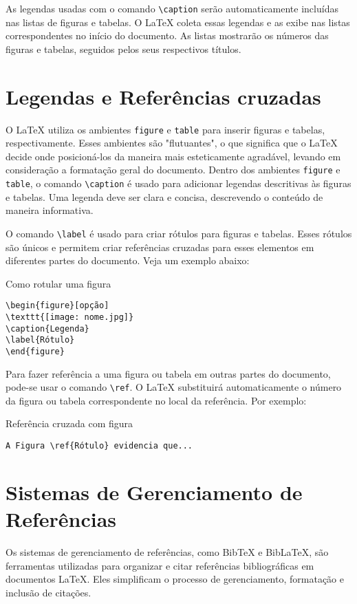\noindent As legendas usadas com o comando \verb|\caption| serão automaticamente incluídas nas listas de figuras e tabelas. O \LaTeX{} coleta essas legendas e as exibe nas listas correspondentes no início do documento. As listas mostrarão os números das figuras e tabelas, seguidos pelos seus respectivos títulos.

\section{Legendas e Referências cruzadas}
\label{sec:4}

O \LaTeX{} utiliza os ambientes \verb|figure| e \verb|table| para inserir figuras e tabelas, respectivamente. Esses ambientes são "flutuantes", o que significa que o \LaTeX{} decide onde posicioná-los da maneira mais esteticamente agradável, levando em consideração a formatação geral do documento. Dentro dos ambientes \verb|figure| e \verb|table|, o comando \verb|\caption| é usado para adicionar legendas descritivas às figuras e tabelas. Uma legenda deve ser clara e concisa, descrevendo o conteúdo de maneira informativa. 

\noindent O comando \verb|\label| é usado para criar rótulos para figuras e tabelas. Esses rótulos são únicos e permitem criar referências cruzadas para esses elementos em diferentes partes do documento. Veja um exemplo abaixo:

\begin{trailer}{Como rotular uma figura}
\begin{verbatim} 
\begin{figure}[opção]
\texttt{[image: nome.jpg]}
\caption{Legenda}
\label{Rótulo}
\end{figure}
\end{verbatim}
\end{trailer}

\noindent Para fazer referência a uma figura ou tabela em outras partes do documento, pode-se usar o comando \verb|\ref|. O \LaTeX{} substituirá automaticamente o número da figura ou tabela correspondente no local da referência. Por exemplo:

\begin{trailer}{Referência cruzada com figura}
\begin{verbatim} 
A Figura \ref{Rótulo} evidencia que...
\end{verbatim}
\end{trailer}

\section{Sistemas de Gerenciamento de Referências}
Os sistemas de gerenciamento de referências, como BibTeX e BibLaTeX, são ferramentas utilizadas para organizar e citar referências bibliográficas em documentos \LaTeX{}. Eles simplificam o processo de gerenciamento, formatação e inclusão de citações. 

